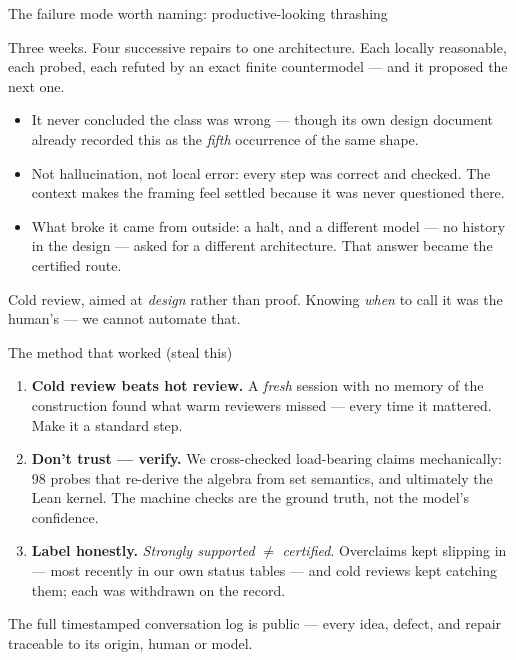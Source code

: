 \documentclass[aspectratio=169,11pt]{beamer}
\begin{document}
\begin{frame}{The failure mode worth naming: productive-looking thrashing}
\begin{center}
\alert{Three weeks. Four} successive repairs to one architecture. Each
locally reasonable, each probed, each refuted by an exact finite
countermodel --- and it proposed the next one.
\end{center}
\begin{itemize}
  \item It never concluded the \alert{class} was wrong --- though its own
        design document already recorded this as the \emph{fifth}
        occurrence of the same shape.
  \item Not hallucination, not local error: \alert{every step was correct
        and checked}. The context makes the framing feel settled because
        it was never questioned there.
  \item What broke it came from outside: a halt, and a \alert{different
        model} --- no history in the design --- asked for a different
        architecture. That answer became the certified route.
\end{itemize}
\vfill
\begin{center}\small
Cold review, aimed at \emph{design} rather than proof. Knowing \emph{when}
to call it was the human's --- \alert{we cannot automate that}.
\end{center}
\end{frame}

\begin{frame}{The method that worked (steal this)}
\begin{enumerate}
  \item \textbf{Cold review beats hot review.} A \emph{fresh} session with no
        memory of the construction found what warm reviewers missed ---
        every time it mattered. Make it a standard step.
  \item \textbf{Don't trust --- verify.} We cross-checked load-bearing claims
        mechanically: 98 probes that re-derive the algebra from set
        semantics, and ultimately the Lean kernel. The machine checks are
        the ground truth, \alert{not the model's confidence}.
  \item \textbf{Label honestly.} \emph{Strongly supported} $\neq$
        \emph{certified}. Overclaims kept slipping in --- most recently in our
        own status tables --- and cold reviews kept catching them; each was
        withdrawn \alert{on the record}.
\end{enumerate}
\vfill
{\small The full timestamped conversation log is public --- every idea,
defect, and repair traceable to its origin, human or model.}
\end{frame}
\end{document}
